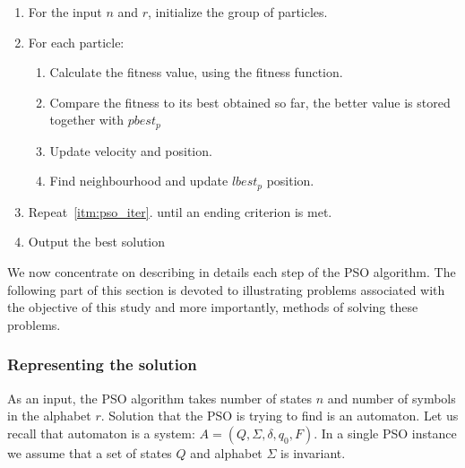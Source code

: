 \documentclass{article}
\begin{document}
\begin{center}

\begin{enumerate}
	\item For the input $n$ and $r$, initialize the group of particles.

	\item For each particle: \label{itm:pso_iter}
	\begin{enumerate}
		\item Calculate the fitness value, using the fitness function.
		\item Compare the fitness to its best obtained so far, the better value is stored together with $pbest_p$	
		
		\item Update velocity and position.	
		
		\item Find neighbourhood and update $lbest_p$ position.
	\end{enumerate}		
	

	
	\item Repeat~\ref{itm:pso_iter}. until an ending criterion is met.

	\item Output the best solution	
	
\end{enumerate}

\end{center}

We now concentrate on describing in details each step of the PSO algorithm. The following part of this section is devoted to illustrating problems associated with the objective of this study and more importantly, methods of solving these problems.


\subsubsection{Representing the solution}
As an input, the PSO algorithm takes number of states $n$ and number of symbols in the alphabet $r$.
Solution that the PSO is trying to find is an automaton. Let us recall that automaton is a system: $A = (Q, \Sigma, \delta, q_0, F)$. In a single PSO instance we assume that a set of states $Q$ and alphabet $\Sigma$ is invariant. 
\end{document}
